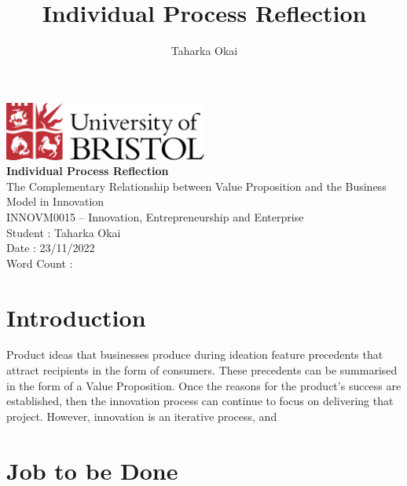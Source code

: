 \documentclass[a4paper,12pt]{article}
\author{Taharka Okai}
\title{Individual Process Reflection}
\begin{document}
\begin{titlepage}
  \begin{center}
    \vspace*{\fill}

    \includegraphics[width=0.5\textwidth]{
      graphics/university-of-bristol-logo-png-transparent}
    \\[1cm]

    {\bfseries\Huge
    Individual Process Reflection}
    \\[1cm]

    {\Huge
    The Complementary Relationship between Value Proposition
    and the Business Model in Innovation}
    \\[1cm]

    {\Large
    INNOVM0015 -- Innovation, Entrepreneurship and Enterprise}
    \\[1cm]

    {\Large
    Student : Taharka Okai \\[.125cm]
    Date    : 23/11/2022   \\[.125cm]
    Word Count    :   \\[.125cm]
    }

    \vspace*{\fill}
  \end{center}
\end{titlepage}

\section{Introduction}
\label{sec:Introduction}

Product ideas that businesses produce during ideation feature precedents
that attract recipients in the form of consumers. These precedents can
be summarised in the form of a Value Proposition. Once the reasons for
the product's success are established, then the innovation process can
continue to focus on delivering that project. However, innovation is an
iterative process, and

\section{Job to be Done}
\label{sec:Job to be Done}
\end{document}
